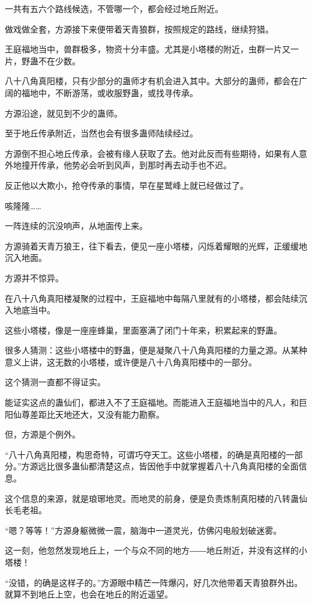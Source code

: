 \begin{this_body}
一共有五六个路线候选，不管哪一个，都会经过地丘附近。

做戏做全套，方源接下来便带着天青狼群，按照规定的路线，继续狩猎。

王庭福地当中，兽群极多，物资十分丰盛。尤其是小塔楼的附近，虫群一片又一片，野蛊不在少数。

八十八角真阳楼，只有少部分的蛊师才有机会进入其中。大部分的蛊师，都会在广阔的福地中，不断游荡，或收服野蛊，或找寻传承。

方源沿途，就见到不少的蛊师。

至于地丘传承附近，当然也会有很多蛊师陆续经过。

方源倒不担心地丘传承，会被有缘人获取了去。他对此反而有些期待，如果有人意外地撞开传承，他势必会听到风声，到那时再去动手也不迟。

反正他以大欺小，抢夺传承的事情，早在星鹫峰上就已经做过了。

咳隆隆……

一阵连续的沉没响声，从地面传上来。

方源骑着天青万狼王，往下看去，便见一座小塔楼，闪烁着耀眼的光辉，正缓缓地沉入地面。

方源并不惊异。

在八十八角真阳楼凝聚的过程中，王庭福地中每隔八里就有的小塔楼，都会陆续沉入地底当中。

这些小塔楼，像是一座座蜂巢，里面塞满了闭门十年来，积累起来的野蛊。

很多人猜测：这些小塔楼中的野蛊，便是凝聚八十八角真阳楼的力量之源。从某种意义上讲，这无数的小塔楼，或许便是八十八角真阳楼中的一部分。

这个猜测一直都不得证实。

能证实这点的蛊仙们，都进入不了王庭福地。而能进入王庭福地当中的凡人，和巨阳仙尊差距比天地还大，又没有能力勘察。

但，方源是个例外。

“八十八角真阳楼，构思奇特，可谓巧夺天工。这些小塔楼，的确是真阳楼的一部分。”方源远比很多蛊仙都清楚这点，皆因他手中就掌握着八十八角真阳楼的全面信息。

这个信息的来源，就是琅琊地灵。而地灵的前身，便是负责炼制真阳楼的八转蛊仙长毛老祖。

“嗯？等等！”方源身躯微微一震，脑海中一道灵光，仿佛闪电般划破迷雾。

这一刻，他忽然发现地丘上，一个与众不同的地方――地丘附近，并没有这样的小塔楼！

“没错，的确是这样子的。”方源眼中精芒一阵爆闪，好几次他带着天青狼群外出。就算不到地丘上空，也会在地丘的附近遥望。


\end{this_body}
